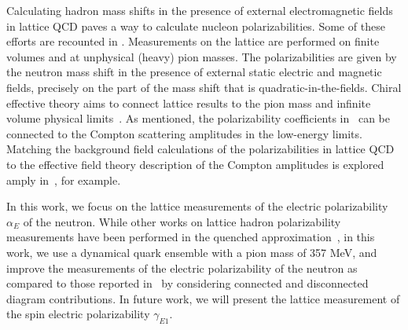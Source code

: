 Calculating hadron mass shifts in the presence of external electromagnetic fields in lattice QCD paves a way to calculate nucleon polarizabilities. Some of these efforts are recounted in \cite{Fiebig:1988en, Christensen:2004ca, Lee:2005dq, Shintani:2006xr, Engelhardt:2007ub, Engelhardt:2009ryp, Detmold:2009dx, Detmold:2010ts, Engelhardt:2011qq, Alexandru:2009id, Lee:2010dq, Lee:2011gz, Lujan:2014kia, Freeman:2014kka, Luschevskaya:2014lga, Lujan:2016ffj, Primer:2013pva, Bignell:2018acn, Bignell:2020xkf, Bignell:2020dze, He:2020ysm, Bignell:2020aye}.
Measurements on the lattice are performed on finite volumes and at unphysical (heavy) pion masses. The polarizabilities are given by the neutron mass shift in the presence of external static electric and 
magnetic fields, precisely on the part of the mass shift that is quadratic-in-the-fields. Chiral effective
theory aims to connect lattice results to the pion mass and infinite volume physical limits~\cite{Detmold:2006vu, He:2020ysm, Hildebrandt:2003fm, Lensky:2015awa, Griesshammer:2015ahu}. As mentioned, the polarizability coefficients in~ can be 
connected to the Compton scattering amplitudes in the low-energy limits. Matching the background field
calculations of the polarizabilities in lattice QCD to the effective field theory description of the Compton
amplitudes is explored amply in~\cite{Lee:2013lxa, Lee:2014iha}, for example.

In this work, we focus on the lattice measurements of the electric polarizability $\alpha_E$ of the neutron.
While other works on lattice hadron polarizability measurements have been performed in the quenched approximation~\cite{Fiebig:1988en, Wilcox:1996vx, Wilcox:1997ee, Zhou:2002km, Christensen:2002wh, Christensen:2004ca, Lee:2005dq, Lee:2005vv}, in this work, we use a dynamical quark ensemble with a pion mass of 357 MeV, and improve the measurements of the electric polarizability of the neutron as compared to those reported in~\cite{Engelhardt:2007ub, Engelhardt:2009ryp} by considering connected and disconnected diagram contributions. In future work, we will present the lattice measurement of the spin electric polarizability $\gamma_{E1}$.

